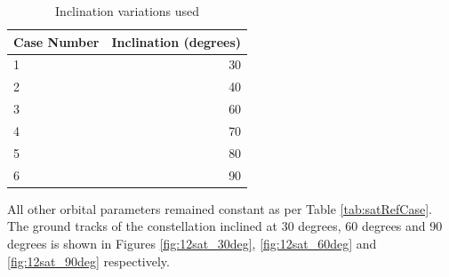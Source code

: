 \begin{table}[H]
  \centering
  \caption{Inclination variations used}
    \begin{tabular}{p{2.5cm}r}
    \toprule
    Case Number & Inclination (degrees) \\
    \midrule
    1     & 30    \\
    2     & 40  \\
    3     & 60   \\
    4     & 70 	\\
    5     & 80    \\
    6     & 90   \\
    \bottomrule
    \end{tabular}%
  \label{tab:inclinationParams}%
\end{table}%
All other orbital parameters remained constant as per Table \ref{tab:satRefCase}. The ground tracks of the constellation inclined at 30 degrees, 60 degrees and 90 degrees is shown in Figures \ref{fig:12sat_30deg}, \ref{fig:12sat_60deg} and \ref{fig:12sat_90deg} respectively.

